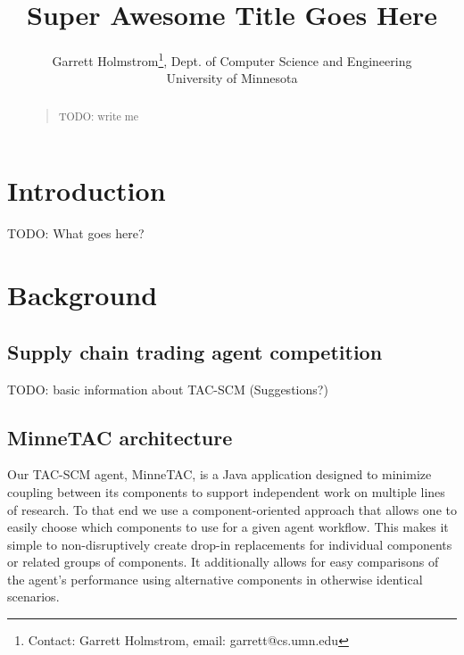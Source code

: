 \documentclass{article}
\begin{document}
\title{Super Awesome Title Goes Here}

\author{Garrett Holmstrom\thanks{Contact: Garrett Holmstrom, email: garrett@cs.umn.edu}, Dept. of Computer Science and Engineering \\ University of Minnesota
}

\date{}

\maketitle

\begin{abstract}
\begin{quote}
TODO:  write me
\end{quote}
\end{abstract}

\section{Introduction}

TODO:  What goes here?

\section{Background}

\subsection{Supply chain trading agent competition}
TODO:  basic information about TAC-SCM  (Suggestions?)

\subsection{MinneTAC architecture}

Our TAC-SCM agent, MinneTAC, is a Java application designed to minimize coupling between its components to support independent work on multiple lines of research.
To that end we use a component-oriented approach that allows one to easily choose which components to use for a given agent workflow.
This makes it simple to non-disruptively create drop-in replacements for individual components or related groups of components.
It additionally allows for easy comparisons of the agent's performance using alternative components in otherwise identical scenarios.
\end{document}
